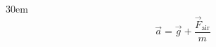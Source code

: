 \documentclass[border=4pt]{standalone}
\begin{document}
\begin{varwidth}{30em}
\large
\[ \vec{a} = \vec{g} + \frac{\vec{F}_{\text{air}}}{m} \]

\end{varwidth}
\end{document}
